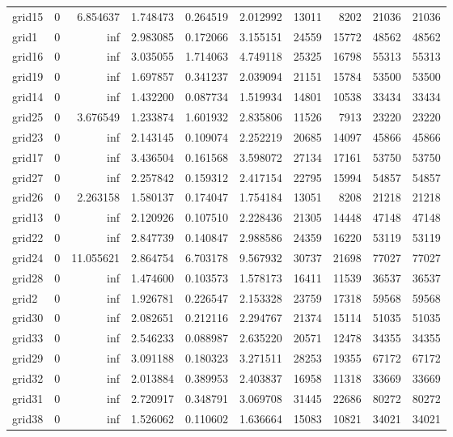 \begin{longtable}{|l|r|r|r|r|r|r|r|r|r|}
grid15 & 0 & 6.854637 & 1.748473 & 0.264519 & 2.012992 & 13011 & 8202 & 21036 & 21036 \\
grid1 & 0 & inf & 2.983085 & 0.172066 & 3.155151 & 24559 & 15772 & 48562 & 48562 \\
grid16 & 0 & inf & 3.035055 & 1.714063 & 4.749118 & 25325 & 16798 & 55313 & 55313 \\
grid19 & 0 & inf & 1.697857 & 0.341237 & 2.039094 & 21151 & 15784 & 53500 & 53500 \\
grid14 & 0 & inf & 1.432200 & 0.087734 & 1.519934 & 14801 & 10538 & 33434 & 33434 \\
grid25 & 0 & 3.676549 & 1.233874 & 1.601932 & 2.835806 & 11526 & 7913 & 23220 & 23220 \\
grid23 & 0 & inf & 2.143145 & 0.109074 & 2.252219 & 20685 & 14097 & 45866 & 45866 \\
grid17 & 0 & inf & 3.436504 & 0.161568 & 3.598072 & 27134 & 17161 & 53750 & 53750 \\
grid27 & 0 & inf & 2.257842 & 0.159312 & 2.417154 & 22795 & 15994 & 54857 & 54857 \\
grid26 & 0 & 2.263158 & 1.580137 & 0.174047 & 1.754184 & 13051 & 8208 & 21218 & 21218 \\
grid13 & 0 & inf & 2.120926 & 0.107510 & 2.228436 & 21305 & 14448 & 47148 & 47148 \\
grid22 & 0 & inf & 2.847739 & 0.140847 & 2.988586 & 24359 & 16220 & 53119 & 53119 \\
grid24 & 0 & 11.055621 & 2.864754 & 6.703178 & 9.567932 & 30737 & 21698 & 77027 & 77027 \\
grid28 & 0 & inf & 1.474600 & 0.103573 & 1.578173 & 16411 & 11539 & 36537 & 36537 \\
grid2 & 0 & inf & 1.926781 & 0.226547 & 2.153328 & 23759 & 17318 & 59568 & 59568 \\
grid30 & 0 & inf & 2.082651 & 0.212116 & 2.294767 & 21374 & 15114 & 51035 & 51035 \\
grid33 & 0 & inf & 2.546233 & 0.088987 & 2.635220 & 20571 & 12478 & 34355 & 34355 \\
grid29 & 0 & inf & 3.091188 & 0.180323 & 3.271511 & 28253 & 19355 & 67172 & 67172 \\
grid32 & 0 & inf & 2.013884 & 0.389953 & 2.403837 & 16958 & 11318 & 33669 & 33669 \\
grid31 & 0 & inf & 2.720917 & 0.348791 & 3.069708 & 31445 & 22686 & 80272 & 80272 \\
grid38 & 0 & inf & 1.526062 & 0.110602 & 1.636664 & 15083 & 10821 & 34021 & 34021 \\

\end{longtable}
